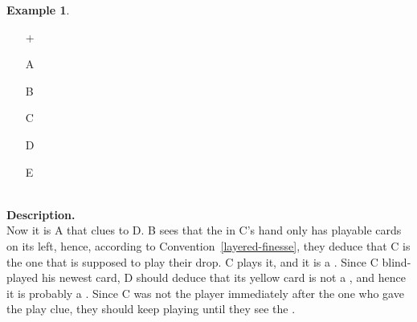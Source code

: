 \documentclass[a4paper]{article}
\theoremstyle{plain}
\theoremstyle{definition}
\newtheorem{example}[theorem]{Example}
\begin{document}
\begin{example}	\hfill \\
	\begin{minipage}{0.45\textwidth}
		\begin{itemize}
			\item[\Large +]      
			\item[\Large A]    
			\item[\Large B]    
			\item[\Large C]    
			\item[\Large D]    
			\item[\Large E]    
		\end{itemize}
	\end{minipage}%
	\begin{minipage}{0.55\textwidth}
		\hfill \\
		
		\textbf{Description.} \\
		
		Now it is A that clues  to D. B sees that the  in C's hand only has playable cards on its left, hence, according to Convention~\ref{layered-finesse}, they deduce that C is the one that is supposed to play their drop. C plays it, and it is a . Since C blind-played his newest card, D should deduce that its yellow card is not a , and hence it is probably a . Since C was not the player immediately after the one who gave the play clue, they should keep playing until they see the .
	\end{minipage}
\end{example} \vspace{0.15 cm}
\end{document}
